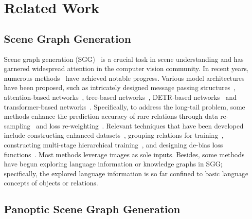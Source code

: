 \section{Related Work}
\label{vlprompt:sec:related_work}

\subsection{Scene Graph Generation}
\label{vlprompt:sec:sgg}

Scene graph generation (SGG)~\citep{lu2016visual} is a crucial task in scene understanding and has garnered widespread attention in the computer vision community.
In recent years, numerous methods~\citep{xu2017scene, zellers2018neural, tang2019learning, lin2020gps, li2022sgtr, shit2022relationformer, zhang2022fine, yu2023visually, hayder2024dsgg, im2024egtr, li2024leveraging, li2025fine} have achieved notable progress.
Various model architectures have been proposed, such as intricately designed message passing structures~\citep{li2017vip, dai2017detecting, li2017scene, zellers2018neural, gu2019scene, hu2022neural}, attention-based networks~\citep{zheng2019visual, qi2019attentive}, tree-based networks~\citep{zhang2017visual, hung2020contextual}, DETR-based networks~\citep{li2022sgtr, shit2022relationformer, cong2023reltr} and transformer-based networks~\citep{hayder2024dsgg, im2024egtr}.
Specifically, to address the long-tail problem, some methods enhance the prediction accuracy of rare relations through data re-sampling~\citep{li2021bipartite} and loss re-weighting~\citep{kang2023skew}.
Relevant techniques that have been developed include constructing enhanced datasets~\citep{zhang2022fine, yu2023visually}, grouping relations for training~\citep{dong2022stacked}, constructing multi-stage hierarchical training~\citep{deng2022hierarchical}, and designing de-bias loss functions~\citep{yu2020cogtree, kang2023skew}.
Most methods leverage images as sole inputs.
Besides, some methods~\citep{lu2016visual, hwang2018tensorize, liao2019natural, zhang2019large, dupty2020visual, zhong2021learning, ye2021linguistic} have begun exploring language information or knowledge graphs in SGG; specifically, the explored language information is so far confined to basic language concepts of objects or relations.


\subsection{Panoptic Scene Graph Generation}
\label{vlprompt:sec:psg}

